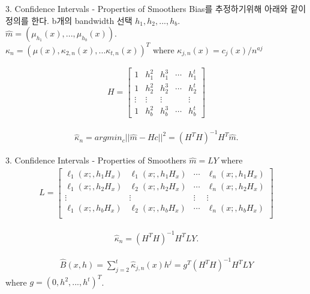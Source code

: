 \documentclass[mathserif]{beamer}
\begin{document}
\begin{frame}{3. Confidence Intervals - Properties of Smoothers}
Bias를 추정하기위해 아래와 같이 정의를 한다.
b개의 bandwidth 선택 $h_1,h_2,...,h_b$. \\
$\hat{m} = (\mu_{h_1}(x),...,\mu_{h_b}(x))$.\\
$\kappa_n = (\mu(x),\kappa_{2,n}(x),...\kappa_{t,n}(x))^{T}$ where $\kappa_{j,n}(x)=c_j(x)/n^{aj}$

\begin{align*}
    H = \begin{bmatrix}
1 & h_1^2 & h_1^3 & \cdots & h_1^t\\
1 & h_2^2 & h_2^3 & \cdots & h_2^t\\
\vdots & \vdots & \vdots &  &  \vdots\\
1 & h_b^2 & h_b^3 & \cdots & h_b^t
\end{bmatrix}
\end{align*}

\begin{align*}
    \hat{\kappa}_n = argmin_c||\hat{m}-Hc||^2 = (H^{T}H)^{-1}H^{T}\hat{m}.
\end{align*}

\end{frame}


\begin{frame}{3. Confidence Intervals - Properties of Smoothers}
$\hat{m} = LY$ where
\begin{align*}
    L = \begin{bmatrix}
\ell_1(x;,h_1H_x) & \ell_1(x;,h_1H_x) & \cdots & \ell_n(x;,h_1H_x)\\
\ell_1(x;,h_2H_x) & \ell_2(x;,h_2H_x) & \cdots & \ell_n(x;,h_2H_x)\\
\vdots & \vdots & \vdots & \vdots\\
\ell_1(x;,h_bH_x) & \ell_2(x;,h_bH_x) & \cdots & \ell_n(x;,h_bH_x)\\
\end{bmatrix}
\end{align*}

\begin{align*}
\hat{\kappa}_n = (H^{T}H)^{-1}H^{T}LY.
\end{align*}

\begin{align*}
\hat{B}(x,h) = \sum_{j=2}^t \hat{\kappa}_{j,n}(x)h^j = g^T(H^TH)^{-1}H^TLY
\end{align*} 
where $g=(0,h^2,...,h^{t})^T$.
\end{frame}
\end{document}
